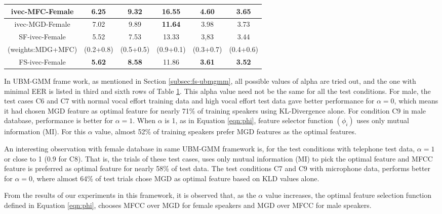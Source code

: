 \documentclass{article}
\begin{document}
\begin{table}[t]
\begin{tabular}{|c|c|c|c|c|c|}
{ivec-MFC-Female} & 6.25 & 9.32 & 16.55 & 4.60 & 3.65 \\ \hline

{ivec-MGD-Female} & 7.02 & 9.89 & {\bf 11.64} & 3.98 & 3.73 \\ \hline 

SF-ivec-Female & 5.52 & 7.53 & 13.33 & 3,83 & 3.44 \\ 
(weights:MDG+MFC) & (0.2+0.8) & (0.5+0.5) & (0.9+0.1) & (0.3+0.7) & (0.4+0.6) \\ \hline

{FS-ivec-Female} & {\bf 5.62} & {\bf 8.58} & 11.86 & {\bf 3.61} & {\bf 3.52} \\ \hline

	\end{tabular}
	\label{tab:eer}
	\end{table}

In UBM-GMM frame work, as mentioned in Section \ref{subsec:fs-ubmgmm}, all possible values of alpha are tried out, and the one with minimal EER is listed in third and sixth rows of Table \ref{tab:eer}. This alpha value need not be the same for all the test conditions. For male, the test cases C6 and C7 with normal vocal effort training   data and high vocal effort test data gave better performance for $\alpha=0$, which means it had chosen MGD feature as optimal feature for nearly 71\% of training speakers using KL-Divergence alone. For condition C9 in male database, performance is better for $\alpha=1$. When $\alpha$ is 1, as in Equation \ref{eqn:phi}, feature selector function $(\phi_i)$ uses only mutual information (MI). For this $\alpha$ value, almost 52\% of training speakers prefer MGD features as the optimal features.

\vspace{0.25cm}

An interesting observation with female database in same UBM-GMM framework is, for the test conditions with telephone test data, $\alpha=1$ or close to 1  (0.9 for C8). That is, the trials of these test cases, uses only mutual information (MI) to pick the optimal feature and MFCC feature is preferred as optimal feature for nearly 58\% of test data. The test conditions C7 and C9 with microphone data, performs better for $\alpha=0$, where almost 64\% of test trials chose MGD as optimal feature based on KLD values alone.

\vspace{0.25cm}
From the results of our experiments in this framework, it is observed that, as the $\alpha$ value increases, the optimal feature selection function defined in Equation \ref{eqn:phi}, chooses MFCC over MGD for female speakers and MGD over MFCC for male speakers.
\end{document}
